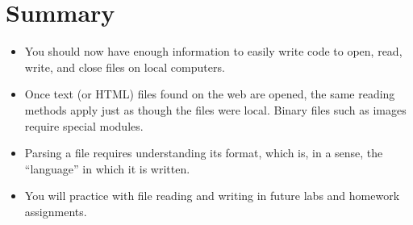 \documentclass[letterpaper,10pt,english]{sphinxmanual}
\begin{document}
\section{Summary}
\label{\detokenize{lecture_notes/lec13_files_web:summary}}\begin{itemize}
\item {} 
You should now have enough information to easily write code to open,
read, write, and close files on local computers.

\item {} 
Once text (or HTML) files found on the web are opened, the same
reading methods apply just as though the files were local. Binary
files such as images require special modules.

\item {} 
Parsing a file requires understanding its format, which is, in a
sense, the “language” in which it is written.

\item {} 
You will practice with file reading and writing in future labs and
homework assignments.

\end{itemize}
\end{document}
